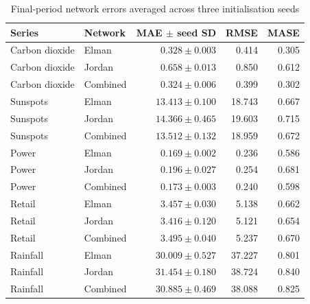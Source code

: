 \begin{table}[t]
\caption{Final-period network errors averaged across three initialisation seeds}
\label{tab:performance}
\centering\small
\begin{tabular}{llrrr}
\toprule
Series & Network & MAE $\pm$ seed SD & RMSE & MASE \\
\midrule
Carbon dioxide & Elman & $0.328\pm0.003$ & 0.414 & 0.305 \\
Carbon dioxide & Jordan & $0.658\pm0.013$ & 0.850 & 0.612 \\
Carbon dioxide & Combined & $0.324\pm0.006$ & 0.399 & 0.302 \\
Sunspots & Elman & $13.413\pm0.100$ & 18.743 & 0.667 \\
Sunspots & Jordan & $14.366\pm0.465$ & 19.603 & 0.715 \\
Sunspots & Combined & $13.512\pm0.132$ & 18.959 & 0.672 \\
Power & Elman & $0.169\pm0.002$ & 0.236 & 0.586 \\
Power & Jordan & $0.196\pm0.027$ & 0.254 & 0.681 \\
Power & Combined & $0.173\pm0.003$ & 0.240 & 0.598 \\
Retail & Elman & $3.457\pm0.030$ & 5.138 & 0.662 \\
Retail & Jordan & $3.416\pm0.120$ & 5.121 & 0.654 \\
Retail & Combined & $3.495\pm0.040$ & 5.237 & 0.670 \\
Rainfall & Elman & $30.009\pm0.527$ & 37.227 & 0.801 \\
Rainfall & Jordan & $31.454\pm0.180$ & 38.724 & 0.840 \\
Rainfall & Combined & $30.885\pm0.469$ & 38.088 & 0.825 \\
\bottomrule
\end{tabular}
\end{table}
